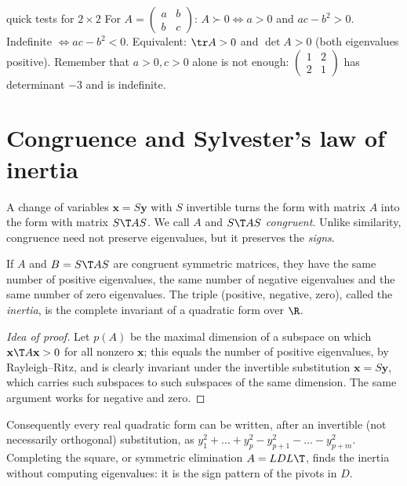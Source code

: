 \begin{interview}{quick tests for $2\times2$}
For $A=\begin{pmatrix}a&b\\b&c\end{pmatrix}$: $A\succ0\iff a>0$ and $ac-b^2>0$. Indefinite $\iff ac-b^2<0$. Equivalent: $\tr A>0$ and $\det A>0$ (both eigenvalues positive). Remember that $a>0,c>0$ alone is not enough: $\begin{pmatrix}1&2\\2&1\end{pmatrix}$ has determinant $-3$ and is indefinite.
\end{interview}

\section{Congruence and Sylvester's law of inertia}

A change of variables $\mathbf{x}=S\mathbf{y}$ with $S$ invertible turns the form with matrix $A$ into the form with matrix $S\T AS$. We call $A$ and $S\T AS$ \emph{congruent}. Unlike similarity, congruence need not preserve eigenvalues, but it preserves the \emph{signs}.

\begin{theorem}\label{thm:inertia}
If $A$ and $B=S\T AS$ are congruent symmetric matrices, they have the same number of positive eigenvalues, the same number of negative eigenvalues and the same number of zero eigenvalues. The triple (positive, negative, zero), called the \emph{inertia}, is the complete invariant of a quadratic form over $\R$.
\end{theorem}

\begin{proof}[Idea of proof]
Let $p(A)$ be the maximal dimension of a subspace on which $\mathbf{x}\T A\mathbf{x}>0$ for all nonzero $\mathbf{x}$; this equals the number of positive eigenvalues, by Rayleigh--Ritz, and is clearly invariant under the invertible substitution $\mathbf{x}=S\mathbf{y}$, which carries such subspaces to such subspaces of the same dimension. The same argument works for negative and zero.
\end{proof}

Consequently every real quadratic form can be written, after an invertible (not necessarily orthogonal) substitution, as $y_1^2+\dots+y_p^2-y_{p+1}^2-\dots-y_{p+m}^2$. Completing the square, or symmetric elimination $A=LDL\T$, finds the inertia without computing eigenvalues: it is the sign pattern of the pivots in $D$.

